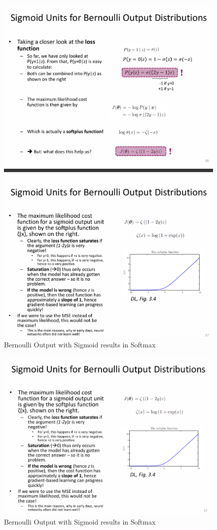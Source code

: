 \documentclass[../Main.tex]{subfiles}
\begin{document}
\begin{figure}[H]
    \centering
    \includegraphics[width=0.75\linewidth]{Images/bernoutput.png}
    \caption{Bernoulli Output with Sigmoid results in Softmax}
    \label{fig:sigmoidtosoftmax}
\end{figure}

\begin{figure}[H]
    \centering
    \includegraphics[width=0.75\linewidth]{Images/bernoutput-softmax.png}
    \caption{Bernoulli Output with Sigmoid results in Softmax}
\end{figure}
\end{document}
